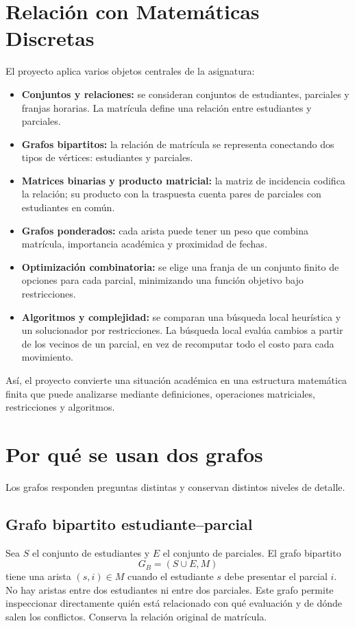 \documentclass[11pt,a4paper]{article}
\begin{document}
\section{Relación con Matemáticas Discretas}
El proyecto aplica varios objetos centrales de la asignatura:
\begin{itemize}[leftmargin=*]
    \item \textbf{Conjuntos y relaciones:} se consideran conjuntos de estudiantes, parciales y franjas horarias. La matrícula define una relación entre estudiantes y parciales.
    \item \textbf{Grafos bipartitos:} la relación de matrícula se representa conectando dos tipos de vértices: estudiantes y parciales.
    \item \textbf{Matrices binarias y producto matricial:} la matriz de incidencia codifica la relación; su producto con la traspuesta cuenta pares de parciales con estudiantes en común.
    \item \textbf{Grafos ponderados:} cada arista puede tener un peso que combina matrícula, importancia académica y proximidad de fechas.
    \item \textbf{Optimización combinatoria:} se elige una franja de un conjunto finito de opciones para cada parcial, minimizando una función objetivo bajo restricciones.
    \item \textbf{Algoritmos y complejidad:} se comparan una búsqueda local heurística y un solucionador por restricciones. La búsqueda local evalúa cambios a partir de los vecinos de un parcial, en vez de recomputar todo el costo para cada movimiento.
\end{itemize}
Así, el proyecto convierte una situación académica en una estructura matemática finita que puede analizarse mediante definiciones, operaciones matriciales, restricciones y algoritmos.

\section{Por qué se usan dos grafos}
Los grafos responden preguntas distintas y conservan distintos niveles de detalle.

\subsection{Grafo bipartito estudiante--parcial}
Sea $S$ el conjunto de estudiantes y $E$ el conjunto de parciales. El grafo bipartito
\[
G_B=(S\cup E,M)
\]
tiene una arista $(s,i)\in M$ cuando el estudiante $s$ debe presentar el parcial $i$. No hay aristas entre dos estudiantes ni entre dos parciales. Este grafo permite inspeccionar directamente quién está relacionado con qué evaluación y de dónde salen los conflictos. Conserva la relación original de matrícula.
\end{document}
